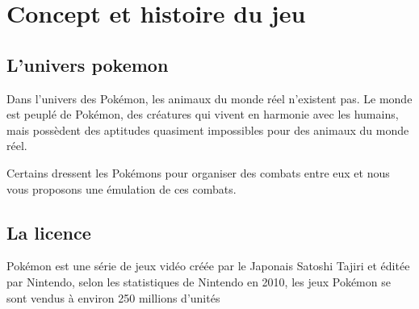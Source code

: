 \section{Concept et histoire du jeu}
	\bigskip
	\subsection{L'univers pokemon}
		Dans l'univers des Pokémon, les animaux du monde réel n'existent pas. Le monde est peuplé de Pokémon, des créatures qui vivent en harmonie avec les humains, 						mais possèdent des aptitudes quasiment impossibles pour des animaux du monde réel.

		Certains dressent les Pokémons pour organiser des combats entre eux et nous vous proposons une émulation de ces combats.
	\subsection{La licence}
		Pokémon est une série de jeux vidéo créée par le Japonais Satoshi Tajiri et éditée par Nintendo, selon les statistiques de Nintendo en 2010, les jeux Pokémon se sont 					vendus à environ 250 millions d’unités
